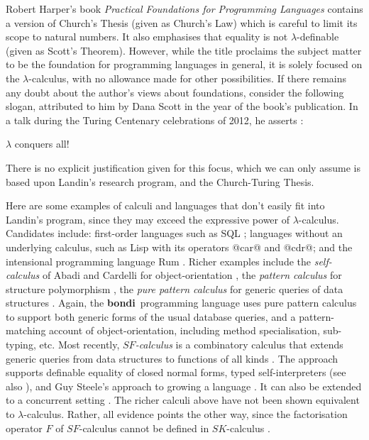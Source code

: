 \documentclass[a4paper]{article}
\begin{document}
Robert Harper's book {\em Practical Foundations for Programming
Languages} \cite{Harper12} contains a version of Church's Thesis
(given as Church's Law) which is careful to limit its scope to natural
numbers.  It also emphasises that equality is not $\lambda$-definable
(given as Scott's Theorem). However, while the title proclaims the
subject matter to be the foundation for programming languages in
general, it is solely focused on the $\lambda$-calculus, with no allowance
made for other possibilities.  If there
remains any doubt about the author's views about foundations, consider
the following slogan, attributed to him by Dana Scott in the year of
the book's publication.  In a talk during the Turing Centenary
celebrations of 2012, he asserts \cite{Scott12}:
\begin{center}
$\lambda$ conquers all!
\end{center}
There is no explicit justification given for this focus, which we can
only assume is based upon Landin's research program, and 
the Church-Turing Thesis.

Here are some examples of calculi and languages that don't easily fit
into Landin's program, since they may exceed the expressive power of
$\lambda$-calculus.  Candidates include: first-order languages such as SQL
\cite{sql}; languages without an underlying calculus, such as Lisp
\cite{McCarthy78a} with its operators @car@ and @cdr@; and the
intensional programming language Rum \cite{Talcott:phd85}.  Richer
examples include the {\em self-calculus} of Abadi and Cardelli for
object-orientation \cite{AC96}, the {\em pattern calculus} for
structure polymorphism \cite{Jay04b}, the {\em pure pattern calculus}
for generic queries of data structures \cite{JK09, pcb}. Again, the
{\bf bondi}\ programming language \cite{bondi}  uses pure pattern
calculus to support both generic forms of the usual database queries,
and a pattern-matching account of object-orientation, including method
specialisation, sub-typing, etc. Most recently, {\em $SF$-calculus} is
a combinatory calculus that extends generic queries from data
structures to functions of all kinds \cite{JGW11}. The approach
supports definable equality of closed normal forms, typed
self-interpreters \cite{JayPalsberg11} (see also
\cite{DBLP:conf/csl/Polonsky11}), and Guy Steele's approach
\cite{steele1999growing} to growing a language \cite{jay2013growing}.
It can also be extended to a concurrent setting
\cite{DBLP:journals/corr/Given-WilsonGJ14,GivenWilson14}.
The richer calculi above have not been shown equivalent to $\lambda$-calculus.
Rather, all evidence points the other way, since the factorisation
operator $F$ of $SF$-calculus cannot be defined in $SK$-calculus
\cite{JGW11}.
\end{document}
